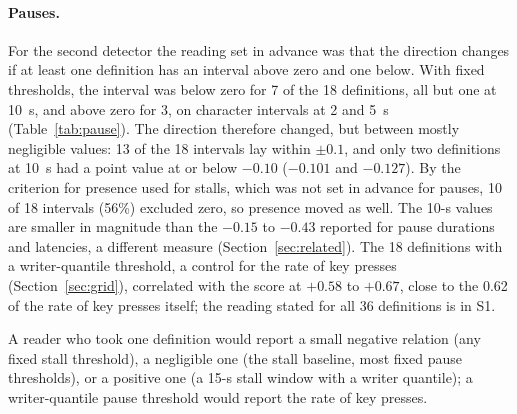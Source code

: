 \paragraph{Pauses.} For the second detector the reading set in advance was that the direction changes if at least one
definition has an interval above zero and one below. With fixed thresholds, the interval was below zero for 7 of the 18
definitions, all but one at 10~s, and above zero for 3, on character intervals at 2 and 5~s (Table~\ref{tab:pause}).
The direction therefore changed, but between mostly negligible values: 13 of the 18 intervals lay within $\pm 0.1$, and only two definitions at
10~s had a point value at or below $-0.10$ ($-0.101$ and $-0.127$). By the criterion for presence used for stalls, which was not
set in advance for pauses, 10 of 18 intervals (56\%) excluded zero, so presence moved as well. The 10-s values are
smaller in magnitude than the $-0.15$ to $-0.43$ reported for pause durations and latencies, a different measure
(Section~\ref{sec:related}). The 18 definitions with a writer-quantile threshold, a control for the rate of key presses
(Section~\ref{sec:grid}), correlated with the score at $+0.58$ to $+0.67$, close to the 0.62 of the rate of key presses
itself; the reading stated for all 36 definitions is in S1.

A reader who took one definition would report a small negative relation (any fixed stall threshold), a
negligible one (the stall baseline, most fixed pause thresholds), or a positive one (a 15-s stall window with a writer
quantile); a writer-quantile pause threshold would report the rate of key presses.

